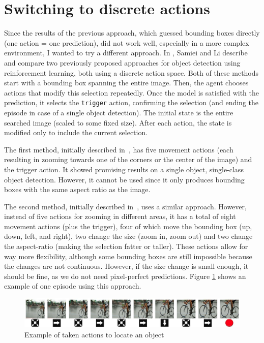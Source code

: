 \documentclass[
  digital,     %
  oneside,     %
  nosansbold,  %
  nocolorbold, %
  lof,         %
  lot,         %
]{fithesis4}
\begin{document}
\section{Switching to discrete actions}
\label{sec:iterative}

Since the results of the previous approach, which guessed bounding boxes directly (one action = one prediction), did not work well, especially in a more complex environment, I wanted to try a different approach. In \cite{rl_object_detection}, Samiei and Li describe and compare two previously proposed approaches for object detection using reinforcement learning, both using a discrete action space. Both of these methods start with a bounding box spanning the entire image. Then, the agent chooses actions that modify this selection repeatedly. Once the model is satisfied with the prediction,  it selects the \texttt{trigger} action, confirming the selection (and ending the episode in case of a single object detection). The initial state is the entire searched image (scaled to some fixed size). After each action, the state is modified only to include the current selection.

The first method, initially described in~\cite{hierarchical_od_with_drl}, has five movement actions (each resulting in zooming towards one of the corners or the center of the image) and the trigger action. It showed promising results on a single object, single-class object detection. However, it cannot be used since it only produces bounding boxes with the same aspect ratio as the image.

The second method, initially described in~\cite{iterative_od_with_rl}, uses a similar approach. However, instead of five actions for zooming in different areas, it has a total of eight movement actions (plus the trigger), four of which move the bounding box (up, down, left, and right), two change the size (zoom in, zoom out) and two change the aspect-ratio (making the selection fatter or taller). These actions allow for way more flexibility, although some bounding boxes are still impossible because the changes are not continuous. However, if the size change is small enough, it should be fine, as we do not need pixel-perfect predictions. Figure \ref{fig:exmaple_from_paper} shows an example of one episode using this approach.

\begin{figure}
    \centering
    \includegraphics[width=1\linewidth]{diagrams/45.jpg}
    \caption{Example of taken actions to locate an object~\cite{iterative_od_with_rl}}
    \label{fig:exmaple_from_paper}
\end{figure}
\end{document}
